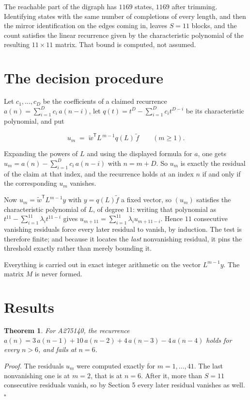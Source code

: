\documentclass[11pt]{article}
\newtheorem{theorem}{Theorem}
\theoremstyle{definition}
\begin{document}
The reachable part of the digraph has $1169$ states, $1169$ after trimming. Identifying states with the same number of completions of every length, and then the mirror identification on the edges coming in, leaves $S = 11$ blocks, and the count satisfies the linear recurrence given by the characteristic polynomial of the resulting $11\times11$ matrix. That bound is computed, not assumed.

\section{The decision procedure}

Let $c_1,\dots,c_D$ be the coefficients of a claimed recurrence $a(n) = \sum_{i=1}^{D} c_i\,a(n-i)$, let $q(t) = t^{D} - \sum_{i=1}^{D} c_i t^{D-i}$ be its characteristic polynomial, and put

\[u_m \;=\; \tilde w^{\mathsf T} L^{\,m-1} q(L)\,\tilde f \qquad (m \ge 1).\]

Expanding the powers of $L$ and using the displayed formula for $a$, one gets $u_m = a(n) - \sum_{i=1}^{D} c_i\,a(n-i)$ with $n = m + D$. So $u_m$ is exactly the residual of the claim at that index, and the recurrence holds at an index $n$ if and only if the corresponding $u_m$ vanishes.

Now $u_m = \tilde w^{\mathsf T} L^{m-1} y$ with $y = q(L)\tilde f$ a fixed vector, so $(u_m)$ satisfies the characteristic polynomial of $L$, of degree $11$: writing that polynomial as $t^{11} - \sum_{i=1}^{11} \lambda_i t^{11-i}$ gives $u_{m+11} = \sum_{i=1}^{11} \lambda_i u_{m+11-i}$. Hence $11$ consecutive vanishing residuals force every later residual to vanish, by induction. The test is therefore finite; and because it locates the {\itshape last} nonvanishing residual, it pins the threshold exactly rather than merely bounding it.

Everything is carried out in exact integer arithmetic on the vector $L^{m-1}y$. The matrix $M$ is never formed.

\section{Results}

\begin{theorem} For A275140, the recurrence $a(n) = 3\,a(n-1) + 10\,a(n-2) + 4\,a(n-3) - 4\,a(n-4)$ holds for every $n > 6$, and fails at $n = 6$.\end{theorem}

{\itshape Proof.} The residuals $u_m$ were computed exactly for $m = 1,\dots,41$. The last nonvanishing one is at $m = 2$, that is at $n = 6$. After it, more than $S = 11$ consecutive residuals vanish, so by Section 5 every later residual vanishes as well. $\square$
\end{document}
